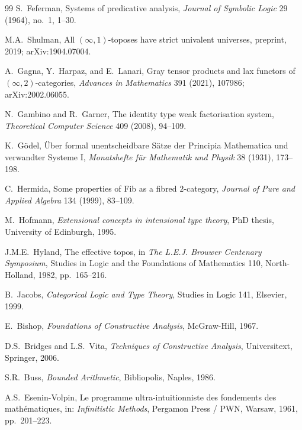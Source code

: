 \documentclass[11pt]{article}
\theoremstyle{plain}
\theoremstyle{definition}
\begin{document}
\begin{thebibliography}{99}
S.~Feferman,
\newblock Systems of predicative analysis,
\newblock \emph{Journal of Symbolic Logic} 29 (1964), no.~1, 1--30.

M.A.~Shulman,
\newblock All $(\infty, 1)$-toposes have strict univalent universes,
\newblock preprint, 2019; arXiv:1904.07004.

A.~Gagna, Y.~Harpaz, and E.~Lanari,
\newblock Gray tensor products and lax functors of $(\infty, 2)$-categories,
\newblock \emph{Advances in Mathematics} 391 (2021), 107986; arXiv:2002.06055.

N.~Gambino and R.~Garner,
\newblock The identity type weak factorisation system,
\newblock \emph{Theoretical Computer Science} 409 (2008), 94--109.

K.~G\"odel,
\newblock \"Uber formal unentscheidbare S\"atze der Principia Mathematica und verwandter Systeme I,
\newblock \emph{Monatshefte f\"ur Mathematik und Physik} 38 (1931), 173--198.

C.~Hermida,
\newblock Some properties of Fib as a fibred $2$-category,
\newblock \emph{Journal of Pure and Applied Algebra} 134 (1999), 83--109.

M.~Hofmann,
\newblock \emph{Extensional concepts in intensional type theory},
\newblock PhD thesis, University of Edinburgh, 1995.

J.M.E.~Hyland,
\newblock The effective topos,
\newblock in \emph{The L.E.J. Brouwer Centenary Symposium}, Studies in Logic and the Foundations of Mathematics 110, North-Holland, 1982, pp.~165--216.

B.~Jacobs,
\newblock \emph{Categorical Logic and Type Theory},
\newblock Studies in Logic 141, Elsevier, 1999.

E.~Bishop,
\newblock \emph{Foundations of Constructive Analysis},
\newblock McGraw-Hill, 1967.

D.S.~Bridges and L.S.~Vita,
\newblock \emph{Techniques of Constructive Analysis},
\newblock Universitext, Springer, 2006.

S.R.~Buss,
\newblock \emph{Bounded Arithmetic},
\newblock Bibliopolis, Naples, 1986.

A.S.~Esenin-Volpin,
\newblock Le programme ultra-intuitionniste des fondements des math\'ematiques,
\newblock in: \emph{Infinitistic Methods}, Pergamon Press / PWN, Warsaw, 1961, pp.~201--223.


\end{thebibliography}
\end{document}
